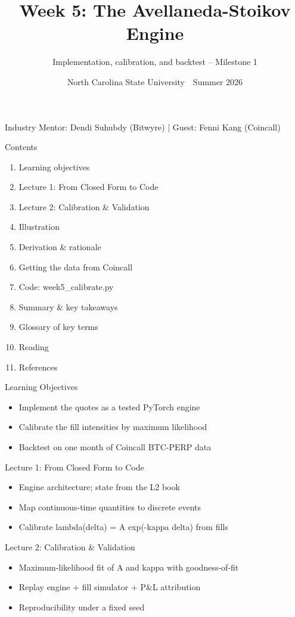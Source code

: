 \documentclass[aspectratio=169,10pt]{beamer}
\title{Week 5: The Avellaneda-Stoikov Engine}
\subtitle{Implementation, calibration, and backtest -- Milestone 1}
\date{North Carolina State University \,\textbar\, Summer 2026}
\begin{document}
\begin{frame}[plain]\titlepage\begin{center}\tiny Industry Mentor: Dendi Suhubdy (Bitwyre)  |  Guest: Fenni Kang (Coincall)\end{center}\end{frame}
\begin{frame}{Contents}
\small\begin{enumerate}\setlength{\itemsep}{3pt}
  \item Learning objectives
  \item Lecture 1: From Closed Form to Code
  \item Lecture 2: Calibration \& Validation
  \item Illustration
  \item Derivation \& rationale
  \item Getting the data from Coincall
  \item Code: week5\_calibrate.py
  \item Summary \& key takeaways
  \item Glossary of key terms
  \item Reading
  \item References
\end{enumerate}
\end{frame}

\begin{frame}{Learning Objectives}
\begin{itemize}
  \item Implement the quotes as a tested PyTorch engine
  \item Calibrate the fill intensities by maximum likelihood
  \item Backtest on one month of Coincall BTC-PERP data
\end{itemize}
\end{frame}

\begin{frame}{Lecture 1: From Closed Form to Code}
\begin{itemize}
  \item Engine architecture; state from the L2 book
  \item Map continuous-time quantities to discrete events
  \item Calibrate lambda(delta) = A exp(-kappa delta) from fills
\end{itemize}
\end{frame}

\begin{frame}{Lecture 2: Calibration \& Validation}
\begin{itemize}
  \item Maximum-likelihood fit of A and kappa with goodness-of-fit
  \item Replay engine + fill simulator + P\&L attribution
  \item Reproducibility under a fixed seed
\end{itemize}
\end{frame}
\end{document}
